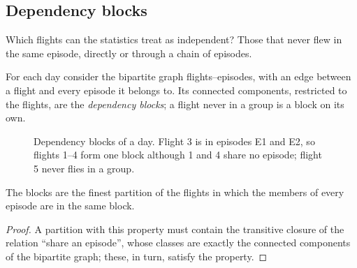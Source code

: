 \subsection{Dependency blocks}\label{sec:blocks}

Which flights can the statistics treat as independent? Those that never flew in the same episode,
directly or through a chain of episodes.

\begin{definition}[block]
For each day consider the bipartite graph flights--episodes, with an edge between a flight and
every episode it belongs to. Its connected components, restricted to the flights, are the
\emph{dependency blocks}; a flight never in a group is a block on its own.
\end{definition}

\begin{figure}
\centering
{}
\caption{Dependency blocks of a day. Flight 3 is in episodes E1 and E2, so flights 1--4 form one
block although 1 and 4 share no episode; flight 5 never flies in a group.}
\label{fig:blocks}
\end{figure}

\begin{proposition}
The blocks are the finest partition of the flights in which the members of every episode are in
the same block.
\end{proposition}

\begin{proof}
A partition with this property must contain the transitive closure of the relation ``share an
episode'', whose classes are exactly the connected components of the bipartite graph; these, in
turn, satisfy the property.
\end{proof}

